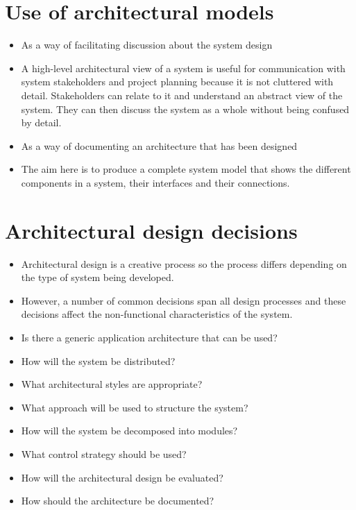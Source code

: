 \section{Use of architectural models}
\begin{itemize}

\item As a way of facilitating discussion about the system design

 \item A high-level architectural view of a system is useful for communication with system stakeholders and project planning because it is not cluttered with detail. Stakeholders can relate to it and understand an abstract view of the system. They can then discuss the system as a whole without being confused by detail.

\item As a way of documenting an architecture that has been designed

 \item The aim here is to produce a complete system model that shows the different components in a system, their interfaces and their connections.
\end{itemize}
\section{Architectural design decisions}
\begin{itemize}

\item Architectural design is a creative process so the process differs depending on the type of system being developed.

\item However, a number of common decisions span all design processes and these decisions affect the non-functional characteristics of the system.

\item Is there a generic application architecture that can be used?

\item How will the system be distributed?

\item What architectural styles are appropriate?

\item What approach will be used to structure the system?

\item How will the system be decomposed into modules?

\item What control strategy should be used?

\item How will the architectural design be evaluated?

\item How should the architecture be documented?

\end{itemize}
